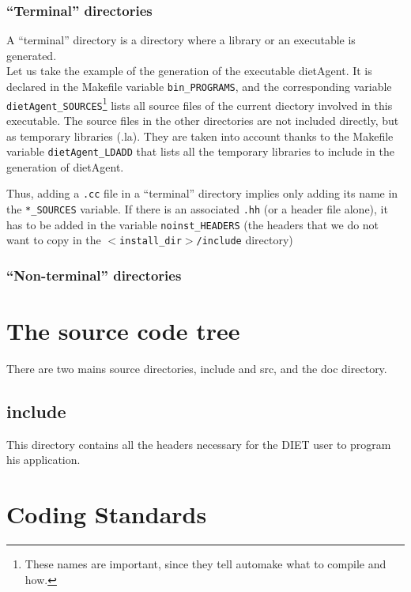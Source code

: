 \documentclass[11pt,a4paper]{report}
\begin{document}
\subsection{``Terminal'' directories}

A ``terminal'' directory is a directory where a library or an executable is
generated.\\

Let us take the example of the generation of the executable \textsf{dietAgent}.
It is declared in the Makefile variable \texttt{bin\_PROGRAMS}, and the
corresponding variable \texttt{dietAgent\_SOURCES}\footnote{These names are
  important, since they tell automake what to compile and how.} lists all source
files of the current diectory involved in this executable. The source files in
the other directories are not included directly, but as temporary libraries
(\textsf{.la}). They are taken into account thanks to the Makefile variable
\texttt{dietAgent\_LDADD} that lists all the temporary libraries to include in
the generation of \textsf{dietAgent}.

Thus, adding a \texttt{.cc} file in a ``terminal'' directory implies only adding
its name in the \texttt{*\_SOURCES} variable. If there is an associated
\texttt{.hh} (or a header file alone), it has to be added in the variable
\texttt{noinst\_HEADERS} (the headers that we do not want to copy in the
\texttt{$<$install\_dir$>$/include} directory)


\subsection{``Non-terminal'' directories}



%
%
\chapter{The source code tree}
\label{ch:tree}

There are two mains source directories, \textsf{include} and \textsf{src}, and
the \textsf{doc} directory.

\section{\textsf{include}}

This directory contains all the headers necessary for the DIET user to program his
application.



%
%
\chapter{Coding Standards}
\label{ch:CS}

\end{document}

